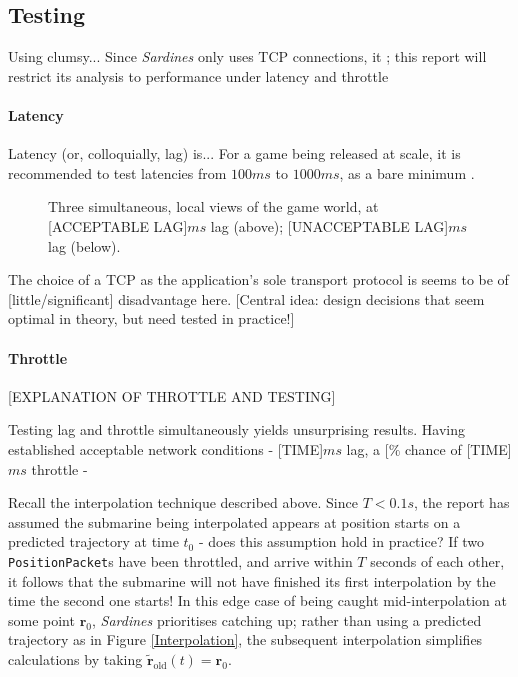 \documentclass[a4paper, 9pt]{article}
\begin{document}
\begin{flushleft}
\pagebreak
\subsection*{Testing}

\vspace{5pt}
Using clumsy...
Since \textit{Sardines} only uses TCP connections, it ; this report will restrict its analysis to performance under latency and throttle

\paragraph{Latency} Latency (or, colloquially, lag) is...
For a game being released at scale, it is recommended to test latencies from $100ms$ to $1000ms$, as a bare minimum \citep{unityNTWK}.

\begin{figure}[h]
\centering
\caption{Three simultaneous, local views of the game world, at [ACCEPTABLE LAG]$ms$ lag (above); [UNACCEPTABLE LAG]$ms$ lag (below).}
\label{Lag Testing}
\end{figure}

\vspace{5pt} The choice of a TCP as the application's sole transport protocol is seems to be of [little/significant] disadvantage here. [Central idea: design decisions that seem optimal in theory, but need tested in practice!]

\paragraph{Throttle} [EXPLANATION OF THROTTLE AND TESTING]

\vspace{5pt}\noindent
Testing lag and throttle simultaneously yields unsurprising results. Having established acceptable network conditions - [TIME]$ms$ lag, a [$\%$ chance of [TIME]$ms$ throttle -

\vspace{5pt}\noindent
Recall the interpolation technique described above. Since $T < 0.1s$, the report has assumed the submarine being interpolated appears at position starts on a predicted trajectory at time $t_0$ - does this assumption hold in practice? If two \texttt{PositionPacket}s have been throttled, and arrive within $T$ seconds of each other, it follows that the submarine will not have finished its first interpolation by the time the second one starts! In this edge case of being caught mid-interpolation at some point $\mathbf{r}_0$, \textit{Sardines} prioritises catching up; rather than using a predicted trajectory as in Figure \ref{Interpolation}, the subsequent interpolation simplifies calculations by taking $\mathbf{\tilde{r}}_{\textrm{old}}(t) = \mathbf{r}_0$.


\end{flushleft}
\end{document}
